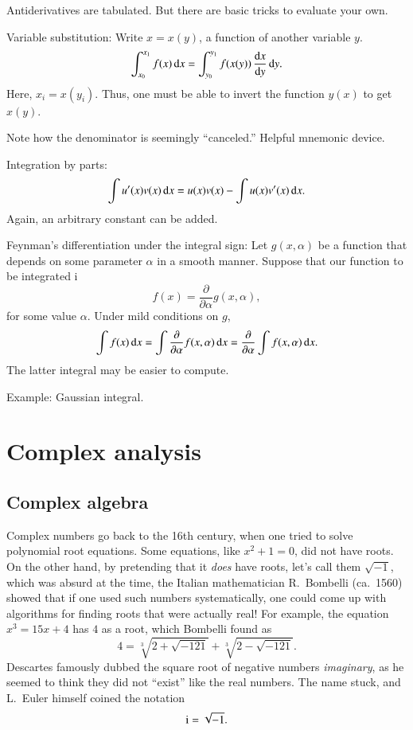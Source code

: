 Antiderivatives are tabulated. But there are basic tricks to evaluate your own.

Variable substitution: Write $x = x(y)$, a function of another variable $y$.
\begin{equation}
    \int_{x_0}^{x_1} f(x) \, \mathrm{d} x = \int_{y_0}^{y_1} f(x(y)) \, \frac{\mathrm{d} x}{\mathrm{d} y} \, \mathrm{d} y.
\end{equation}
Here, $x_i = x(y_i)$. Thus, one must be able to invert the function $y(x)$ to get $x(y)$.

Note how the denominator is seemingly ``canceled.'' Helpful mnemonic device.

Integration by parts:
\begin{equation}
    \int u'(x) v(x) \, \mathrm{d} x = u(x) v(x) - \int u(x) v'(x) \, \mathrm{d} x.
\end{equation}
Again, an arbitrary constant can be added.

Feynman's differentiation under the integral sign: Let $g(x,\alpha)$ be a function that depends on some parameter $\alpha$ in a smooth manner. Suppose that our function to be integrated i
\begin{equation}
f(x) = \frac{\partial}{\partial \alpha} g(x,\alpha), 
\end{equation}
for some value $\alpha$. Under mild conditions on $g$, 
\begin{equation}
    \int f(x) \, \mathrm{d} x =   \int \frac{\partial}{\partial \alpha} f(x,\alpha) \, \mathrm{d} x = \frac{\partial}{\partial \alpha} \int f(x,\alpha) \, \mathrm{d} x.
\end{equation}
The latter integral may be easier to compute.

Example: Gaussian integral.



\section{Complex analysis}


\subsection{Complex algebra}

Complex numbers go back to the 16th century, when one tried to solve polynomial root equations. Some equations, like $x^2 + 1= 0$, did not have roots. On the other hand, by pretending that it \emph{does} have roots, let's call them $\sqrt{-1}$, which was absurd at the time, the Italian mathematician R.~Bombelli (ca.~1560) showed that if one used such numbers systematically, one could come up with algorithms for finding roots that were actually real! For example, the equation $x^3 = 15x + 4$ has $4$ as a root, which Bombelli found as
\begin{equation}
    4 = \sqrt[3]{2 + \sqrt{-121}} + \sqrt[3]{2 - \sqrt{-121}}.
\end{equation}
Descartes famously dubbed the square root of negative numbers \emph{imaginary}, as he seemed to think they did not ``exist'' like the real numbers. The name stuck, and L.~Euler himself coined the notation
\begin{equation}
    \mathrm{i} = \sqrt{-1}.
\end{equation}


